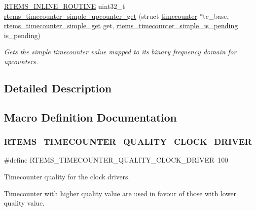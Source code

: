 \begin{DoxyCompactItemize}
\mbox{\hyperlink{group__RTEMSScoreBaseDefs_gac216239df231d5dbd15e3520b0b9313f}{R\+T\+E\+M\+S\+\_\+\+I\+N\+L\+I\+N\+E\+\_\+\+R\+O\+U\+T\+I\+NE}} uint32\+\_\+t \mbox{\hyperlink{group__SAPITimecounter_ga0f1dc14b096be72170ec9d854c8bb79d}{rtems\+\_\+timecounter\+\_\+simple\+\_\+upcounter\+\_\+get}} (struct \mbox{\hyperlink{structtimecounter}{timecounter}} $\ast$tc\+\_\+base, \mbox{\hyperlink{group__SAPITimecounter_gaf994ec0741af793766d17b42ee91a501}{rtems\+\_\+timecounter\+\_\+simple\+\_\+get}} get, \mbox{\hyperlink{group__SAPITimecounter_gaaa16abdeb0f4bea8e2d535187ba33589}{rtems\+\_\+timecounter\+\_\+simple\+\_\+is\+\_\+pending}} is\+\_\+pending)
\begin{DoxyCompactList}\small\item\em Gets the simple timecounter value mapped to its binary frequency domain for upcounters. \end{DoxyCompactList}\end{DoxyCompactItemize}


\subsection{Detailed Description}


\subsection{Macro Definition Documentation}
\mbox{\label{group__SAPITimecounter_ga509ef767dcae10363b53e02b0205398c}} 
\subsubsection{\texorpdfstring{RTEMS\_TIMECOUNTER\_QUALITY\_CLOCK\_DRIVER}{RTEMS\_TIMECOUNTER\_QUALITY\_CLOCK\_DRIVER}}
{\footnotesize\ttfamily \#define R\+T\+E\+M\+S\+\_\+\+T\+I\+M\+E\+C\+O\+U\+N\+T\+E\+R\+\_\+\+Q\+U\+A\+L\+I\+T\+Y\+\_\+\+C\+L\+O\+C\+K\+\_\+\+D\+R\+I\+V\+ER~100}



Timecounter quality for the clock drivers. 

Timecounter with higher quality value are used in favour of those with lower quality value. 

